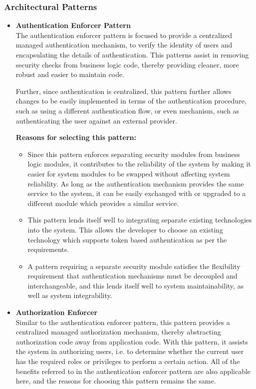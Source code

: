 \documentclass[a4paper,10pt]{article}
\begin{document}
\subsubsection{Architectural Patterns}
	\begin{itemize}
		\item \textbf{Authentication Enforcer Pattern} \\
		The authentication enforcer pattern is focused to provide a centralized managed authentication mechanism, to verify the identity of users and encapsulating the details of authentication. This patterns assist in removing security checks from business logic code, thereby providing cleaner, more robust and easier to maintain code.
		
		Further, since authentication is centralized, this pattern further allows changes to be easily implemented in terms of the authentication procedure, such as using a different authentication flow, or even mechanism, such as authenticating the user against an external provider.
		
		\subitem \textbf{Reasons for selecting this pattern:}
		\begin{itemize}
			\item Since this pattern enforces separating security modules from business logic modules, it contributes to the reliability of the system by making it easier for system modules to be swapped without affecting system reliability. As long as the authentication mechanism provides the same service to the system, it can be easily exchanged with or upgraded to a different module which provides a similar service.
			\item This pattern lends itself well to integrating separate existing technologies into the system. This allows the developer to choose an existing technology which supports token based authentication as per the requirements.
			\item A pattern requiring a separate security module satisfies the flexibility requirement that authentication mechanisms must be decoupled and interchangeable, and this lends itself well to system maintainability, as well as system integrability.
		\end{itemize}
	
		\item \textbf{Authorization Enforcer} \\
		Similar to the authentication enforcer pattern, this pattern provides a centralized managed authorization mechanism, thereby abstracting authorization code away from application code.  With this pattern, it assists the system in authorizing users, i.e. to determine whether the current user has the required roles or privileges to perform a certain action. All of the benefits referred to in the authentication enforcer pattern are also applicable here, and the reasons for choosing this pattern remains the same.
	

\end{itemize}
\end{document}
